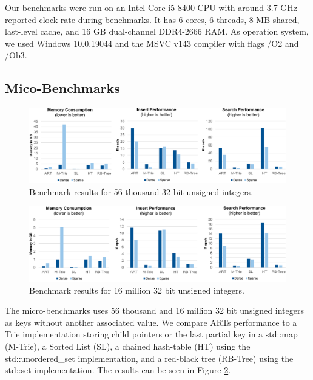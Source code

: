 \documentclass[acmtog, nonacm]{acmart}
\begin{document}
Our benchmarks were run on an Intel Core i5-8400 CPU with around 3.7 GHz reported clock rate during benchmarks.
It has 6 cores, 6 threads, 8 MB shared, last-level cache, and 16 GB dual-channel DDR4-2666 RAM. As operation system, we used Windows 10.0.19044 and the MSVC v143 compiler with flags /O2 and /Ob3.

\subsection{Mico-Benchmarks}

\begin{figure}
    \centering
    \includegraphics[width=\textwidth]{images/05-art-micro-benchmark-56.PNG}
    \caption{Benchmark results for 56 thousand 32 bit unsigned integers.}
    \label{fig:art-micro-benchmark}
\end{figure}

\begin{figure}
    \centering
    \includegraphics[width=\textwidth]{images/06-art-micro-benchmark-16.PNG}
    \caption{Benchmark results for 16 million 32 bit unsigned integers.}
    \label{fig:art-micro-benchmark}
\end{figure}

The micro-benchmarks uses 56 thousand and 16 million 32 bit unsigned integers as keys without another associated value. We compare ARTs 
performance to a Trie implementation storing child pointers or the last partial key in a std::map (M-Trie), a 
Sorted List (SL), a chained hash-table (HT) using the std::unordered\_set implementation, and a red-black tree 
(RB-Tree) using the std::set implementation. The results can be seen in Figure \ref{fig:art-micro-benchmark}.
\end{document}

